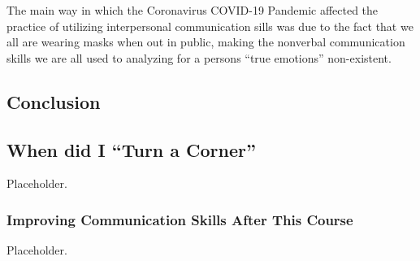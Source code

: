 \documentclass[stu,12pt]{apa7}
\begin{document}
          The main way in which the Coronavirus COVID-19 Pandemic affected
            the practice of utilizing interpersonal communication sills was
            due to the fact that we all are wearing masks when out in public,
            making the nonverbal communication skills we are all used to
            analyzing for a persons ``true emotions'' non-existent.


    \subsection{Conclusion}
      \subsection{When did I ``Turn a Corner''}
        Placeholder.
      \subsubsection{Improving Communication Skills After This Course}
        Placeholder.




  \newpage
  \printbibliography[%
    title={References},%
    heading={bibintoc},%
    notcategory={consulted}%
  ]
  \newpage
  \nocite{*}
  \printbibliography[%
    title={Additional References},%
    heading={bibintoc},%
    category={consulted}%
  ]
\end{document}
